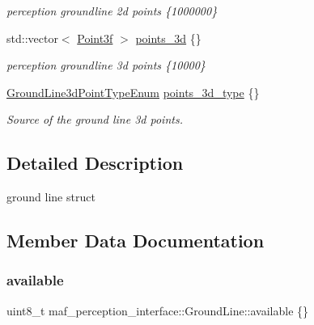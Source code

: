 \begin{DoxyCompactItemize}
\begin{DoxyCompactList}\small\item\em perception groundline 2d points \{1000000\} \end{DoxyCompactList}\item 
std\+::vector$<$ \hyperlink{structmaf__perception__interface_1_1Point3f}{Point3f} $>$ \hyperlink{structmaf__perception__interface_1_1GroundLine_a3f88b0df7ca0125e7b1a86486ffc16a1}{points\+\_\+3d} \{\}
\begin{DoxyCompactList}\small\item\em perception groundline 3d points \{10000\} \end{DoxyCompactList}\item 
\hyperlink{structmaf__perception__interface_1_1GroundLine3dPointTypeEnum}{Ground\+Line3d\+Point\+Type\+Enum} \hyperlink{structmaf__perception__interface_1_1GroundLine_ae32e8ce8d84a7e2834f502c72b5be687}{points\+\_\+3d\+\_\+type} \{\}
\begin{DoxyCompactList}\small\item\em Source of the ground line 3d points. \end{DoxyCompactList}\end{DoxyCompactItemize}


\subsection{Detailed Description}
ground line struct 

\subsection{Member Data Documentation}
\mbox{\label{structmaf__perception__interface_1_1GroundLine_abfd58567c9045d0e57056f62e4f21040}} 
\subsubsection{\texorpdfstring{available}{available}}
{\footnotesize\ttfamily uint8\+\_\+t maf\+\_\+perception\+\_\+interface\+::\+Ground\+Line\+::available \{\}}



